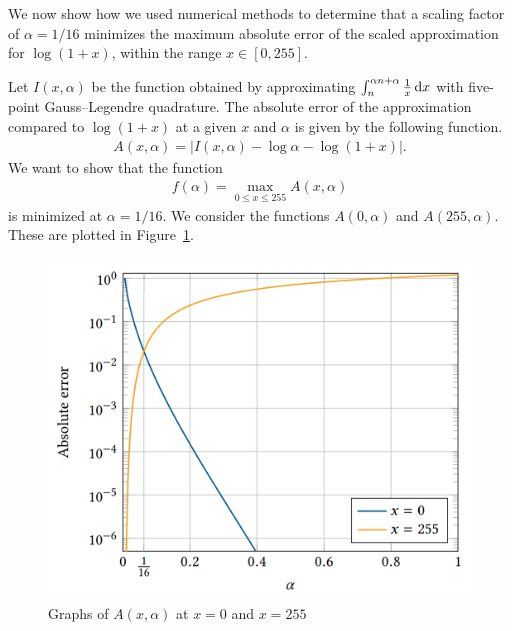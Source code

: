 We now show how we used numerical methods to determine that a scaling factor of $\alpha = 1/16$ minimizes the maximum absolute error of the scaled approximation for $\log{\left(1+x\right)}$, within the range $x \in [0, 255]$.

Let $I\left(x,\alpha\right)$ be the function obtained by approximating $\int_{n}^{\alpha n + \alpha}{\frac{1}{x}\mathop{}\!\mathrm{d} x}$ with five-point Gauss--Legendre quadrature. The absolute error of the approximation compared to $\log{\left(1+x\right)}$ at a given $x$ and $\alpha$ is given by the following function.
\begin{align*}
	A\left(x,\alpha\right) = \left| I\left(x,\alpha\right) - \log\alpha - \log{\left(1+x\right)}\right|.
\end{align*}
We want to show that the function
\begin{align*}
	f\left(\alpha\right) = \max_{0\leq x \leq 255}{A\left(x,\alpha\right)}
\end{align*}
is minimized at $\alpha = 1/16$.
We consider the functions $A\left(0,\alpha\right)$ and $A\left(255,\alpha\right)$. These are plotted in Figure~\ref{fig:endpoint_plot}.
\begin{figure}[!ht]
	\centering
    \includegraphics[width=12cm]{figures/graph_0_255.png}
	\caption{Graphs of $A\left(x,\alpha\right)$ at $x=0$ and $x=255$}
	\label{fig:endpoint_plot}
\end{figure}

